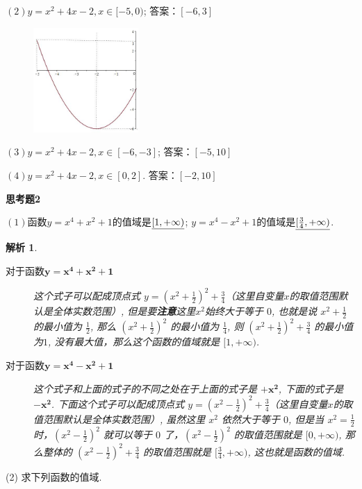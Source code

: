 \documentclass{article}
\theoremstyle{plain}
\newtheorem{aly}{解析}
\begin{document}
$(2) y=x^2+4x-2, x\in [-5,0)$; \hspace{25pt} 答案：$[-6,3]$
\begin{figure}[h]
  \centering
  \includegraphics[width=4cm]{2-2.jpg}
  \label{2-2}
\end{figure}

$(3) y=x^2+4x-2, x\in [-6,-3]$; \hspace{25pt} 答案：$[-5,10]$

$(4) y=x^2+4x-2, x\in [0,2]$. \hspace{25pt} 答案：$[-2,10]$
\vspace{15pt}

\textbf{思考题2}

$(1) $函数$y=x^4+x^2+1$的值域是$\uline{[1,+\infty)}$; $y=x^4-x^2+1$的值域是$\uline{[ \frac{3}{4},+\infty)}$.

\begin{aly}
  \begin{description}
     \item[对于函数$\mathbf{y=x^4+x^2+1}$] 这个式子可以配成\emph{顶点式} $y=(x^2+\frac{1}{2})^2+\frac{3}{4}$（这里自变量$x$的取值范围默认是全体实数范围）, 但是要\textbf{注意}这里$x^2$始终大于等于 $0$, 也就是说 $x^2+\frac{1}{2}$ 的最小值为 $\frac{1}{2}$, 那么 $(x^2+\frac{1}{2})^2$ 的最小值为 $\frac{1} {4}$, 则 $(x^2+\frac{1}{2})^2+\frac{3}{4}$ 的最小值为$1$, 没有最大值，那么这个函数的值域就是 $[1,+\infty)$.
     \item[对于函数$\mathbf{y=x^4-x^2+1}$] 这个式子和上面的式子的不同之处在于上面的式子是 $\mathbf{+x^2}$, 下面的式子是 $\mathbf{-x^2}$. 下面这个式子可以配成\emph{顶点式} $y=(x^2-\frac{1}{2})^2+\frac{3}{4}$（这里自变量$x$的取值范围默认是全体实数范围）, 虽然这里 $x^2$ 依然大于等于 $0$, 但是当 $x^2=\frac{1}{2}$ 时，$(x^2-\frac{1}{2})^2$ 就可以等于 $0$ 了，$(x^2-\frac{1}{2})^2$ 的取值范围就是 $[0,+\infty)$, 那么整体的 $ (x^2-\frac{1}{2})^2+\frac{3}{4}$ 的取值范围就是 $[\frac{3}{4},+\infty)$, 这也就是函数的值域.
   \end{description}
\end{aly}

(2) 求下列函数的值域.
\end{document}
